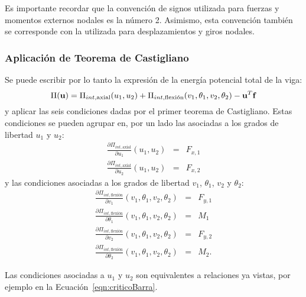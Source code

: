 Es importante recordar que la convención de signos utilizada para fuerzas y momentos externos nodales es la número 2. %
%
Asimismo, esta convención también se corresponde con la utilizada para desplazamientos y giros nodales. %


\subsubsection{Aplicación de Teorema de Castigliano}

Se puede escribir por lo tanto la expresión de la energía potencial total de la viga:
%
\begin{equation}
	\Pi ({\bf u}) =  \Pi_{int,\text{axial}}(u_1,u_2) + \Pi_{int,\text{flexión}}(v_1,\theta_1,v_2,\theta_2) - {\bf u}^T {\bf f}
\end{equation}
%
y aplicar las seis condiciones dadas por el primer teorema de Castigliano. Estas condiciones se pueden agrupar en, por un lado las asociadas a los grados de libertad $u_1$ y $u_2$:
%
\begin{eqnarray}
	\frac{\partial \Pi_{int,\text{axial}} }{\partial u_1}(u_1, u_2)  &=& F_{x,1} \\
	\frac{\partial  \Pi_{int,\text{axial}} }{\partial u_2}(u_1, u_2)  &=& F_{x,2} 
\end{eqnarray}
y las condiciones asociadas a los grados de libertad $v_1$, $\theta_1$, $v_2$ y $\theta_2$:
%
\begin{eqnarray}
	\frac{\partial \Pi_{int,\text{flexión}} }{\partial v_1}(v_1,\theta_1,v_2,\theta_2) &=& F_{y,1} \\
	\frac{\partial \Pi_{int,\text{flexión}} }{\partial \theta_1}(v_1,\theta_1,v_2,\theta_2)  &=& M_1 \label{eqn:ut3castm1} \\
	\frac{\partial \Pi_{int,\text{flexión}} }{\partial v_2}(v_1,\theta_1,v_2,\theta_2)  &=& F_{y,2} \\
	\frac{\partial \Pi_{int,\text{flexión}} }{\partial \theta_2}(v_1,\theta_1,v_2,\theta_2)  &=& M_2.
\end{eqnarray}


Las condiciones asociadas a $u_1$ y $u_2$ son equivalentes a relaciones ya vistas, por ejemplo en la Ecuación~\eqref{eqn:criticoBarra}.


